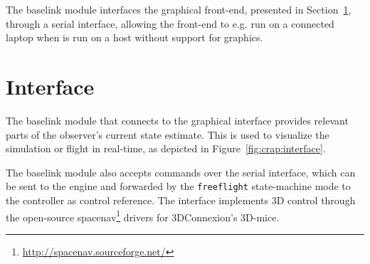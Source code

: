             The baselink module interfaces the graphical front-end, presented in Section~\ref{sec:crap:interface},
            through a serial interface, allowing the front-end to e.g. run on
            a connected laptop when \crap is run on a host without support for graphics.

    \section{Interface}
    \label{sec:crap:interface}
        The baselink module that connects to the graphical interface
        provides relevant parts of the observer's current state estimate.
        This is used to visualize the simulation or flight in real-time, as
        depicted in Figure~\ref{fig:crap:interface}.

        The baselink module also accepts commands over the serial interface,
        which can be sent to the \crap engine and forwarded by the \texttt{freeflight}
        state-machine mode to the controller as control reference.
        The interface implements 3D control through the open-source
        spacenav\footnote{\url{http://spacenav.sourceforge.net/}} drivers
        for 3DConnexion's 3D-mice.

